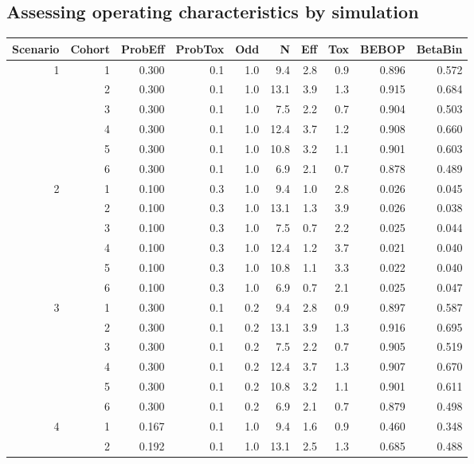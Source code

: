 \documentclass[alpha-refs]{wiley-article}
\begin{document}
\subsection{Assessing operating characteristics by simulation}
\begin{table}[ht]
\centering
\begin{tabular}{rrrrrrrrrr}
  \hline
Scenario & Cohort & ProbEff & ProbTox & Odd & N & Eff & Tox & BEBOP & BetaBin \\ 
  \hline
1 & 1 & 0.300 & 0.1 & 1.0 & 9.4 & 2.8 & 0.9 & 0.896 & 0.572 \\ 
   & 2 & 0.300 & 0.1 & 1.0 & 13.1 & 3.9 & 1.3 & 0.915 & 0.684 \\ 
   & 3 & 0.300 & 0.1 & 1.0 & 7.5 & 2.2 & 0.7 & 0.904 & 0.503 \\ 
   & 4 & 0.300 & 0.1 & 1.0 & 12.4 & 3.7 & 1.2 & 0.908 & 0.660 \\ 
   & 5 & 0.300 & 0.1 & 1.0 & 10.8 & 3.2 & 1.1 & 0.901 & 0.603 \\ 
   & 6 & 0.300 & 0.1 & 1.0 & 6.9 & 2.1 & 0.7 & 0.878 & 0.489 \\ 
   \hline
2 & 1 & 0.100 & 0.3 & 1.0 & 9.4 & 1.0 & 2.8 & 0.026 & 0.045 \\ 
   & 2 & 0.100 & 0.3 & 1.0 & 13.1 & 1.3 & 3.9 & 0.026 & 0.038 \\ 
   & 3 & 0.100 & 0.3 & 1.0 & 7.5 & 0.7 & 2.2 & 0.025 & 0.044 \\ 
   & 4 & 0.100 & 0.3 & 1.0 & 12.4 & 1.2 & 3.7 & 0.021 & 0.040 \\ 
   & 5 & 0.100 & 0.3 & 1.0 & 10.8 & 1.1 & 3.3 & 0.022 & 0.040 \\ 
   & 6 & 0.100 & 0.3 & 1.0 & 6.9 & 0.7 & 2.1 & 0.025 & 0.047 \\ 
   \hline
3 & 1 & 0.300 & 0.1 & 0.2 & 9.4 & 2.8 & 0.9 & 0.897 & 0.587 \\ 
   & 2 & 0.300 & 0.1 & 0.2 & 13.1 & 3.9 & 1.3 & 0.916 & 0.695 \\ 
   & 3 & 0.300 & 0.1 & 0.2 & 7.5 & 2.2 & 0.7 & 0.905 & 0.519 \\ 
   & 4 & 0.300 & 0.1 & 0.2 & 12.4 & 3.7 & 1.3 & 0.907 & 0.670 \\ 
   & 5 & 0.300 & 0.1 & 0.2 & 10.8 & 3.2 & 1.1 & 0.901 & 0.611 \\ 
   & 6 & 0.300 & 0.1 & 0.2 & 6.9 & 2.1 & 0.7 & 0.879 & 0.498 \\ 
   \hline
4 & 1 & 0.167 & 0.1 & 1.0 & 9.4 & 1.6 & 0.9 & 0.460 & 0.348 \\ 
   & 2 & 0.192 & 0.1 & 1.0 & 13.1 & 2.5 & 1.3 & 0.685 & 0.488 \\ 

\end{tabular}
\end{table}
\end{document}
